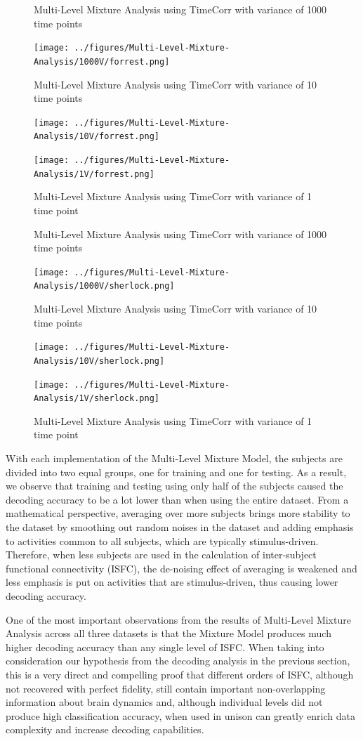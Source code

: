 \documentclass[11pt]{article}
\begin{document}
\begin{figure}[!htb]
\caption{Multi-Level Mixture Analysis using TimeCorr with variance of 1000 time points}
\centering
\texttt{[image: ../figures/Multi-Level-Mixture-Analysis/1000V/forrest.png]}
\label{fig:forrestMM1000}
\caption{Multi-Level Mixture Analysis using TimeCorr with variance of 10 time points}
\centering
\texttt{[image: ../figures/Multi-Level-Mixture-Analysis/10V/forrest.png]}
\label{fig:forrestMM10}
\caption{Multi-Level Mixture Analysis using TimeCorr with variance of 1 time point}
\centering
\texttt{[image: ../figures/Multi-Level-Mixture-Analysis/1V/forrest.png]}
\label{fig:forrestMM1}
\end{figure}


\begin{figure}[!htb]
\caption{Multi-Level Mixture Analysis using TimeCorr with variance of 1000 time points}
\centering
\texttt{[image: ../figures/Multi-Level-Mixture-Analysis/1000V/sherlock.png]}
\label{fig:sherlockMM1000}
\caption{Multi-Level Mixture Analysis using TimeCorr with variance of 10 time points}
\centering
\texttt{[image: ../figures/Multi-Level-Mixture-Analysis/10V/sherlock.png]}
\label{fig:sherlockMM10}
\caption{Multi-Level Mixture Analysis using TimeCorr with variance of 1 time point}
\centering
\texttt{[image: ../figures/Multi-Level-Mixture-Analysis/1V/sherlock.png]}
\label{fig:sherlockMM1}
\end{figure}

With each implementation of the Multi-Level Mixture Model, the subjects are divided into two equal groups, one for training and one for testing. As a result, we observe that training and testing using only half of the subjects caused the decoding accuracy to be a lot lower than when using the entire dataset. From a mathematical perspective, averaging over more subjects brings more stability to the dataset by smoothing out random noises in the dataset and adding emphasis to activities common to all subjects, which are typically stimulus-driven. Therefore, when less subjects are used in the calculation of inter-subject functional connectivity (ISFC), the de-noising effect of averaging is weakened and less emphasis is put on activities that are stimulus-driven, thus causing lower decoding accuracy.

One of the most important observations from the results of Multi-Level Mixture Analysis across all three datasets is that the Mixture Model produces much higher decoding accuracy than any single level of ISFC. When taking into consideration our hypothesis from the decoding analysis in the previous section, this is a very direct and compelling proof that different orders of ISFC, although not recovered with perfect fidelity, still contain important non-overlapping information about brain dynamics and, although individual levels did not produce high classification accuracy, when used in unison can greatly enrich data complexity and increase decoding capabilities.
\end{document}
